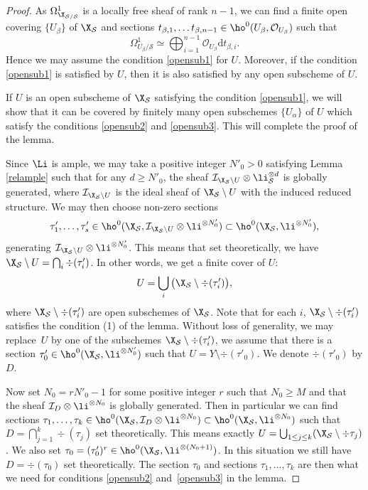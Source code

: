 \begin{proof}[Proof]
As $\Omega^1_{\X_{\mathcal{S}/\mathcal{S}}}$ is a locally free sheaf of rank $n-1$,
we can find a finite open covering $\{U_{\beta}\}$ of $\X_{\mathcal{S}}$ and sections $t_{\beta,1},\dots t_{\beta,n-1}\in \ho^0(U_{\beta}, \mathcal{O}_{U_{\beta}})$ such that
\[
\Omega^1_{U_{\beta}/\mathcal{S}}\simeq \bigoplus_{i=1}^{n-1} \mathcal{O}_{U_{\beta}}\mathrm{d} t_{\beta,i}.
\]
Hence we may assume the condition \eqref{opensub1} for $U$. Moreover, if the condition \eqref{opensub1} is satisfied by $U$, then it is also satisfied by any open subscheme of $U$.

If $U$ is an open subscheme of $\X_{\mathcal{S}}$ satisfying the condition \eqref{opensub1}, we will show that it can be covered by finitely many open subschemes $\{U_{\alpha}\}$ of $U$ which satisfy the conditions \eqref{opensub2} and \eqref{opensub3}. This will complete the proof of the lemma.

Since $\Li$ is ample, we may take a positive integer $N'_0>0$ satisfying Lemma \ref{relample} such that for any $d\geq N'_0$, the sheaf $\mathcal{I}_{\X_{\mathcal{S}}\setminus U}\otimes \li_{\mathcal{S}}^{\otimes d}$ is globally generated, where $\mathcal{I}_{\X_{\mathcal{S}}\setminus U}$ is the ideal sheaf of $\X_{\mathcal{S}}\setminus U$ with the induced reduced structure. We may then choose non-zero sections
\[
\tau'_{1},\dots, \tau'_s\in \ho^0(\X_{\mathcal{S}}, \mathcal{I}_{\X_{\mathcal{S}}\setminus U}\otimes \li^{\otimes N'_0})\subset \ho^0(\X_{\mathcal{S}}, \li^{\otimes N'_0}),
\]
generating $\mathcal{I}_{\X_{\mathcal{S}}\setminus U}\otimes \li^{\otimes N'_0}$. This means that set theoretically, we have $\X_{\mathcal{S}}\setminus U=\bigcap_{i}\div (\tau'_i)$. In other words, we get a finite cover of $U$:
\[
U=\bigcup_{i}\big(\X_{\mathcal{S}}\setminus \div (\tau'_i) \big),
\]
where $\X_{\mathcal{S}}\setminus \div (\tau'_i)$ are open subschemes of $\X_{\mathcal{S}}$. Note that for each $i$, $\X_{\mathcal{S}}\setminus \div (\tau'_i)$ satisfies the condition (1) of the lemma. Without loss of generality, we may replace~$U$ by one of the subschemes $\X_{\mathcal{S}}\setminus \div (\tau'_i)$, \ie we assume that there is a section $\tau'_0\in \ho^0(\X_{\mathcal{S}}, \li^{\otimes N'_0})$ such that $U=Y\setminus\div (\tau'_0)$. We denote $\div (\tau'_0)$ by $D$.

Now set $N_0=r N'_0-1$ for some positive integer $r$ such that $N_0\geq M$ and that the sheaf $\mathcal{I}_D\otimes \li^{\otimes N_0}$ is globally generated. Then in particular we can find sections $\tau_1,\dots, \tau_k\in \ho^0(\X_{\mathcal{S}}, \mathcal{I}_D\otimes \li^{\otimes N_0})\subset \ho^0(\X_{\mathcal{S}}, \li^{\otimes N_0})$ such that $D=\bigcap_{j=1}^k\div (\tau_j)$ set theoretically. This means exactly $U=\bigcup_{1\leq j\leq k}(\X_{\mathcal{S}}\setminus \div \tau_{j})$. We also set $\tau_0=(\tau'_0)^r\in \ho^0(\X_{\mathcal{S}}, \li^{\otimes (N_0+1)})$. In this situation we still have $D=\div (\tau_0)$ set theoretically. The section $\tau_0$ and sections $\tau_1,\dots, \tau_k$ are then what we need for conditions \eqref{opensub2} and~\eqref{opensub3} in the lemma.
\end{proof}

